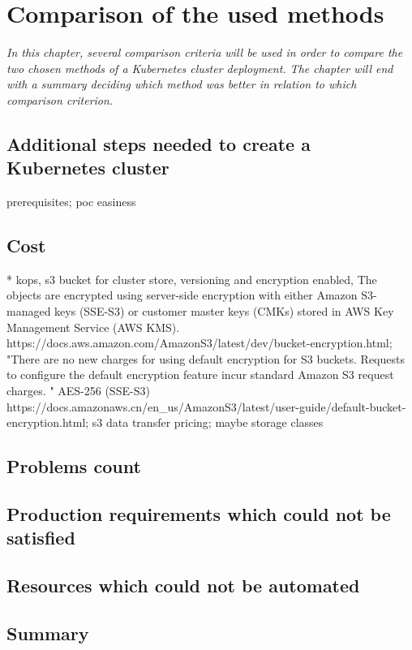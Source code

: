 \section{Comparison of the used methods}
\textit{In this chapter, several comparison criteria will be used in order to compare the two chosen methods of a Kubernetes cluster deployment. The chapter will end with a summary deciding which method was better in relation to which comparison criterion.}

\subsection{Additional steps needed to create a Kubernetes cluster}
prerequisites; poc easiness

\subsection{Cost}

* kops, s3 bucket for cluster store, versioning and encryption enabled,  The objects are encrypted using server-side encryption with either Amazon S3-managed keys (SSE-S3) or customer master keys (CMKs) stored in AWS Key Management Service (AWS KMS). https://docs.aws.amazon.com/AmazonS3/latest/dev/bucket-encryption.html; "There are no new charges for using default encryption for S3 buckets. Requests to configure the default encryption feature incur standard Amazon S3 request charges. " AES-256 (SSE-S3) https://docs.amazonaws.cn/en_us/AmazonS3/latest/user-guide/default-bucket-encryption.html; s3 data transfer pricing; maybe storage classes

\subsection{Problems count}
\subsection{Production requirements which could not be satisfied}
\subsection{Resources which could not be automated}
\subsection{Summary}
